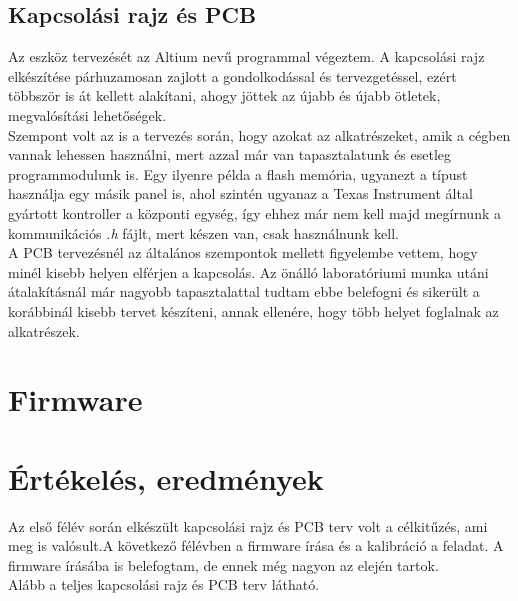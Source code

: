\documentclass[a4paper, 12pt]{article}
\newcommand{\tab}{\hspace*{1em}}
\begin{document}
\subsection{Kapcsolási rajz és PCB}
\tab Az eszköz tervezését az Altium\textregistered{} nevű programmal végeztem. A kapcsolási rajz elkészítése párhuzamosan zajlott a gondolkodással és tervezgetéssel, ezért többször is át kellett alakítani, ahogy jöttek az újabb és újabb ötletek, megvalósítási lehetőségek.\\
Szempont volt az is a tervezés során, hogy azokat az alkatrészeket, amik a cégben vannak lehessen használni, mert azzal már van tapasztalatunk és esetleg programmodulunk is. Egy ilyenre példa a flash memória, ugyanezt a típust használja egy másik panel is, ahol szintén ugyanaz a Texas Instrument által gyártott kontroller a központi egység, így ehhez már nem kell majd megírnunk a kommunikációs \emph{.h} fájlt, mert készen van, csak használnunk kell.\\
A PCB tervezésnél az általános szempontok mellett figyelembe vettem, hogy minél kisebb helyen elférjen a kapcsolás. Az önálló laboratóriumi munka utáni átalakításnál már nagyobb tapasztalattal tudtam ebbe belefogni és sikerült a korábbinál kisebb tervet készíteni, annak ellenére, hogy több helyet foglalnak az alkatrészek.

\section{Firmware}

\section{Értékelés, eredmények}
\tab Az első félév során elkészült kapcsolási rajz és PCB terv volt a célkitűzés, ami meg is valósult.A következő félévben a firmware írása és a kalibráció  a feladat. A firmware írásába is belefogtam, de ennek még nagyon az elején tartok.\\
Alább a teljes kapcsolási rajz és PCB terv látható.







\end{document}
